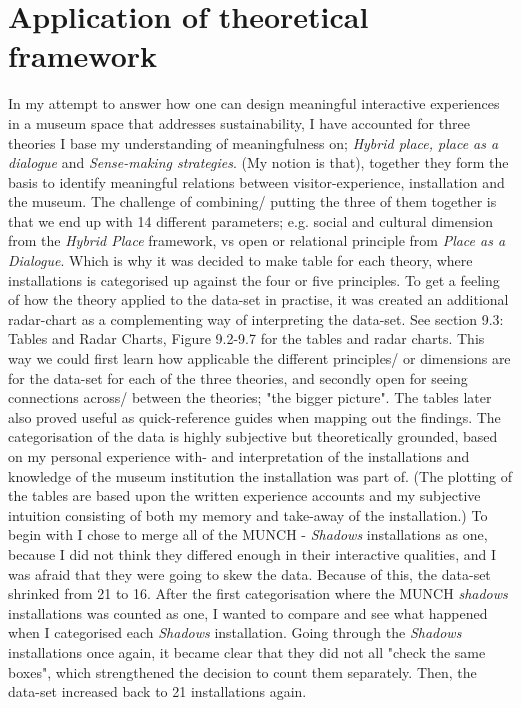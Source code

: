 \section{Application of theoretical framework}
In my attempt to answer how one can design meaningful interactive experiences in a museum space that addresses sustainability, I have accounted for three theories I base my understanding of meaningfulness on; \emph{Hybrid place, place as a dialogue} and \emph{Sense-making strategies}. (My notion is that), together they form the basis to identify meaningful relations between visitor-experience, installation and the museum. The challenge of combining/ putting the three of them together is that we end up with 14 different parameters; e.g. social and cultural dimension from the \emph{Hybrid Place} framework, vs open or relational principle from \emph{Place as a Dialogue}. Which is why it was decided to make table for each theory, where installations is categorised up against the four or five principles. To get a feeling of how the theory applied to the data-set in practise, it was created an additional radar-chart as a complementing way of interpreting the data-set. See section 9.3: Tables and Radar Charts, Figure 9.2-9.7 for the tables and radar charts. This way we could first learn how applicable the different principles/ or dimensions are for the data-set for each of the three theories, and secondly open for seeing connections across/ between the theories; "the bigger picture". The tables later also proved useful as quick-reference guides when mapping out the findings. The categorisation of the data is highly subjective but theoretically grounded, based on my personal experience with- and interpretation of the installations and knowledge of the museum institution the installation was part of. (The plotting of the tables are based upon the written experience accounts and my subjective intuition consisting of both my memory and take-away of the installation.) To begin with I chose to merge all of the MUNCH - \emph{Shadows} installations as one, because I did not think they differed enough in their interactive qualities, and I was afraid that they were going to skew the data. Because of this, the data-set shrinked from 21 to 16. After the first categorisation where the MUNCH \emph{shadows} installations was counted as one, I wanted to compare and see what happened when I categorised each \emph{Shadows} installation. Going through the \emph{Shadows} installations once again, it became clear that they did not all "check the same boxes", which strengthened the decision to count them separately. Then, the data-set increased back to 21 installations again.

